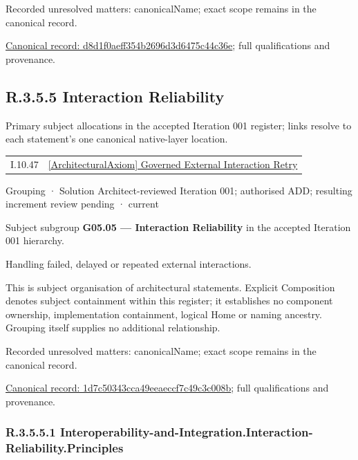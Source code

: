 {\small Recorded unresolved matters: canonicalName; exact scope remains in the canonical record.}\par
{\footnotesize \href{../../../../continuum/grouping/d8d1f0aeff354b2696d3d6475c44c36e.md}{Canonical record: d8d1f0aeff354b2696d3d6475c44c36e}; full qualifications and provenance.}\par
\subsection*{R.3.5.5 Interaction Reliability}
\label{navigation:R.3.5.5}

Primary subject allocations in the accepted Iteration 001 register; links resolve to each statement’s one canonical native-layer location.\par
\begin{longtable}{p{.22\linewidth}p{.73\linewidth}}
I.10.47 & \hyperref[element:49c13eb367b44565a011a77b90108cb8]{[ArchitecturalAxiom] Governed External Interaction Retry} \\
\end{longtable}
\label{element:1d7c50343cca49eeaeccf7c49c3c008b}
{\small Grouping · Solution Architect-reviewed Iteration 001; authorised ADD; resulting increment review pending · current}\par

Subject subgroup \textbf{G05.05 — Interaction Reliability} in the accepted Iteration 001 hierarchy.



Handling failed, delayed or repeated external interactions.



This is subject organisation of architectural statements. Explicit Composition denotes subject containment within this register; it establishes no component ownership, implementation containment, logical Home or naming ancestry. Grouping itself supplies no additional relationship.


{\small Recorded unresolved matters: canonicalName; exact scope remains in the canonical record.}\par
{\footnotesize \href{../../../../continuum/grouping/1d7c50343cca49eeaeccf7c49c3c008b.md}{Canonical record: 1d7c50343cca49eeaeccf7c49c3c008b}; full qualifications and provenance.}\par
\subsubsection*{R.3.5.5.1 Interoperability-and-Integration.Interaction-Reliability.Principles}
\label{navigation:R.3.5.5.1}

